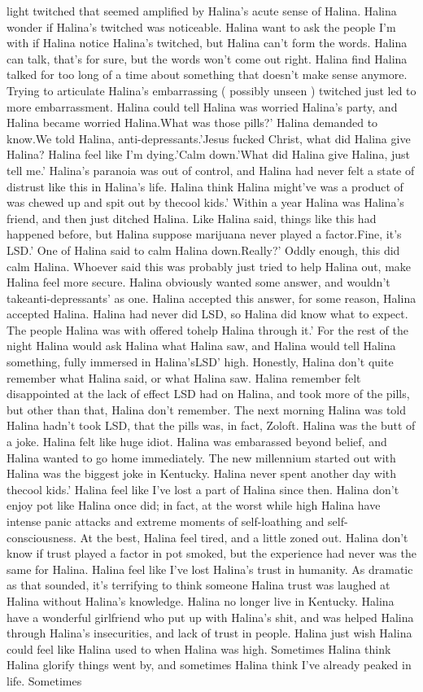 \documentclass[12pt]{book}
\begin{document}
light twitched that seemed amplified by Halina's acute sense of Halina. Halina wonder if Halina's twitched was noticeable. Halina want to ask the people I'm with if Halina notice Halina's twitched, but Halina can't form the words. Halina can talk, that's for sure, but the words won't come out right. Halina find Halina talked for too long of a time about something that doesn't make sense anymore. Trying to articulate Halina's embarrassing ( possibly unseen ) twitched just led to more embarrassment. Halina could tell Halina was worried Halina's party, and Halina became worried Halina.What was those pills?' Halina demanded to know.We told Halina, anti-depressants.'Jesus fucked Christ, what did Halina give Halina? Halina feel like I'm dying.'Calm down.'What did Halina give Halina, just tell me.' Halina's paranoia was out of control, and Halina had never felt a state of distrust like this in Halina's life. Halina think Halina might've was a product of was chewed up and spit out by thecool kids.' Within a year Halina was Halina's friend, and then just ditched Halina. Like Halina said, things like this had happened before, but Halina suppose marijuana never played a factor.Fine, it's LSD.' One of Halina said to calm Halina down.Really?' Oddly enough, this did calm Halina. Whoever said this was probably just tried to help Halina out, make Halina feel more secure. Halina obviously wanted some answer, and wouldn't takeanti-depressants' as one. Halina accepted this answer, for some reason, Halina accepted Halina. Halina had never did LSD, so Halina did know what to expect. The people Halina was with offered tohelp Halina through it.' For the rest of the night Halina would ask Halina what Halina saw, and Halina would tell Halina something, fully immersed in Halina'sLSD' high. Honestly, Halina don't quite remember what Halina said, or what Halina saw. Halina remember felt disappointed at the lack of effect LSD had on Halina, and took more of the pills, but other than that, Halina don't remember. The next morning Halina was told Halina hadn't took LSD, that the pills was, in fact, Zoloft. Halina was the butt of a joke. Halina felt like huge idiot. Halina was embarassed beyond belief, and Halina wanted to go home immediately. The new millennium started out with Halina was the biggest joke in Kentucky. Halina never spent another day with thecool kids.' Halina feel like I've lost a part of Halina since then. Halina don't enjoy pot like Halina once did; in fact, at the worst while high Halina have intense panic attacks and extreme moments of self-loathing and self-consciousness. At the best, Halina feel tired, and a little zoned out. Halina don't know if trust played a factor in pot smoked, but the experience had never was the same for Halina. Halina feel like I've lost Halina's trust in humanity. As dramatic as that sounded, it's terrifying to think someone Halina trust was laughed at Halina without Halina's knowledge. Halina no longer live in Kentucky. Halina have a wonderful girlfriend who put up with Halina's shit, and was helped Halina through Halina's insecurities, and lack of trust in people. Halina just wish Halina could feel like Halina used to when Halina was high. Sometimes Halina think Halina glorify things went by, and sometimes Halina think I've already peaked in life. Sometimes 
\end{document}
